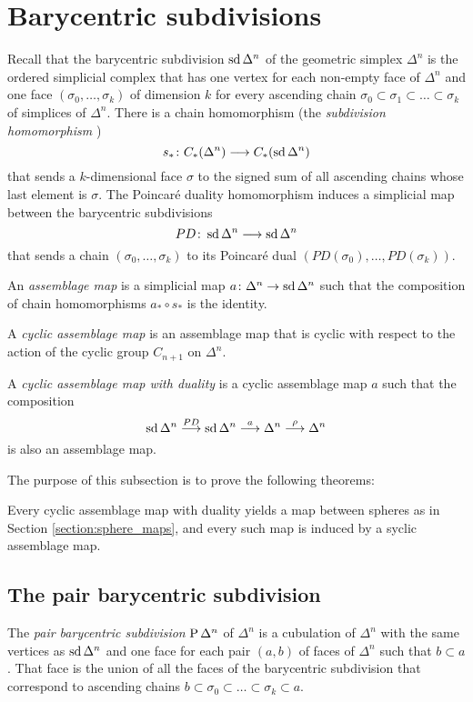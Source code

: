 \section{Barycentric subdivisions} Recall that the barycentric subdivision $\operatorname{sd} \Delta^n$ of the geometric simplex $\Delta^n$ is the ordered simplicial complex that has one vertex for each non-empty face of $\Delta^n$ and one face $(\sigma_0,\ldots,\sigma_k)$ of dimension $k$ for every ascending chain $\sigma_0\subset \sigma_1\subset\ldots \subset \sigma_k$ of simplices of $\Delta^n$. There is a chain homomorphism (the \emph{subdivision homomorphism} \cite[\P 1.12]{NR})
\[
    s_*\colon C_*(\Delta^n)\longrightarrow C_*(\operatorname{sd} \Delta^n)
\]
that sends a $k$-dimensional face $\sigma$ to the signed sum of all ascending chains whose last element is $\sigma$. The Poincaré duality homomorphism induces a simplicial map between the barycentric subdivisions
\[PD\colon \operatorname{sd} \Delta^n\longrightarrow \operatorname{sd} \Delta^n\]
that sends a chain $(\sigma_0,\ldots,\sigma_k)$ to its Poincaré dual $(PD(\sigma_0),\ldots,PD(\sigma_k))$.
\begin{definition}
    An \emph{assemblage map} is a simplicial map $a\colon \Delta^n\to \operatorname{sd} \Delta^n$ such that the composition of chain homomorphisms $a_*\circ s_*$ is the identity.
\end{definition}
\begin{definition}
    A \emph{cyclic assemblage map} is an assemblage map that is cyclic with respect to the action of the cyclic group $C_{n+1}$ on $\Delta^n$.
\end{definition}
\begin{definition}
    A \emph{cyclic assemblage map with duality} is a cyclic assemblage map $a$ such that the composition
    \[\operatorname{sd} \Delta^n \overset{PD}{\longrightarrow} \operatorname{sd} \Delta^n \overset{a}{\longrightarrow} \Delta^n\overset{\rho}{\longrightarrow} \Delta^n \]
    is also an assemblage map.
\end{definition}
The purpose of this subsection is to prove the following theorems:
\begin{theorem} 
    Every cyclic assemblage map with duality yields a map between spheres as in Section \ref{section:sphere_maps}, and every such map is induced by a syclic assemblage map.
\end{theorem}

\subsection{The pair barycentric subdivision} The \emph{pair barycentric subdivision} $\operatorname{P} \Delta^n$ of $\Delta^n$ is a cubulation of $\Delta^n$ with the same vertices as $\operatorname{sd} \Delta^n$ and one face for each pair $(a,b)$ of faces of $\Delta^n$ such that $b\subset a$. That face is the union of all the faces of the barycentric subdivision that correspond to ascending chains $b\subset \sigma_0\subset \ldots\subset \sigma_k\subset a$. 

